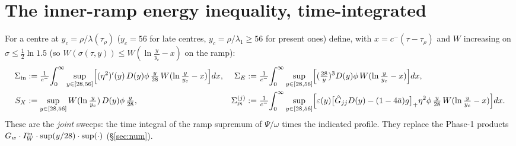 \documentclass[11pt]{article}
\theoremstyle{remark}\newtheorem{remark}[theorem]{Remark}
\begin{document}
\section{The inner-ramp energy inequality, time-integrated}\label{sec:U}
\noindent For a centre at $y_c=\rho/\lambda(\tau_\rho)$ ($y_c=56$ for late centres, $y_c=\rho/\lambda_1\ge56$ for present ones) define, with $x=c^-(\tau-\tau_\rho)$ and $W$ increasing on $\sigma\le\frac12\ln1.5$ (so $W(\sigma(\tau,y))\le W(\ln\frac y{y_c}-x)$ on the ramp):
\begin{align*}
\Sigma_{\rm in}&:=\tfrac1{c^-}\!\int_0^\infty\sup_{y\in[28,56]}\Bigl[(\eta^2)'(y)\,D(y)\phi\,\tfrac y{28}\,W(\ln\tfrac y{y_c}-x)\Bigr]dx, &
\Sigma_{E}&:=\tfrac1{c^-}\!\int_0^\infty\sup_{y\in[28,56]}\Bigl[(\tfrac{28}y)^3D(y)\phi\,W(\ln\tfrac y{y_c}-x)\Bigr]dx,\\
S_X&:=\sup_{y\in[28,56]}W(\ln\tfrac y{y_c})\,D(y)\phi\,\tfrac y{28}, &
\Sigma_{\rm rs}^{(j)}&:=\tfrac1{c^-}\!\int_0^\infty\sup_{y\in[28,56]}\Bigl[\varepsilon(y)\bigl[\hat G_{jj}D(y)-(1-4\bar a)g\bigr]_+\eta^2\phi\,\tfrac y{28}\,W(\ln\tfrac y{y_c}-x)\Bigr]dx .
\end{align*}
These are the \emph{joint} sweeps: the time integral of the ramp supremum of $\Psi/\omega$ times the indicated profile. They replace the Phase-1 products $G_w\cdot I_W^{\rm in}\cdot\sup(y/28)\cdot\sup(\cdot)$ (§\ref{sec:num}).
\end{document}

